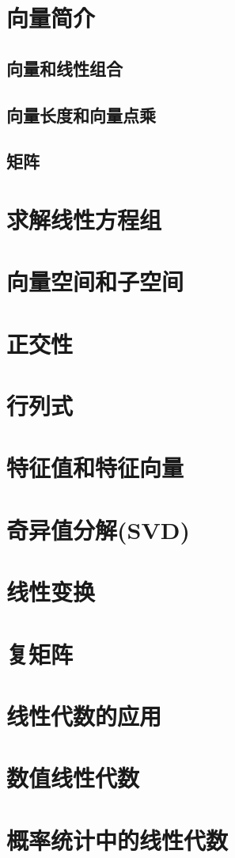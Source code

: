 \documentclass{ctexart}
\begin{document}

\section{向量简介}
\subsection{向量和线性组合}
\subsection{向量长度和向量点乘}
\subsection{矩阵}
\section{求解线性方程组}
\section{向量空间和子空间}
\section{正交性}
\section{行列式}
\section{特征值和特征向量}
\section{奇异值分解(SVD)}
\section{线性变换}
\section{复矩阵}
\section{线性代数的应用}
\section{数值线性代数}
\section{概率统计中的线性代数}

% 
% 

\end{document}
